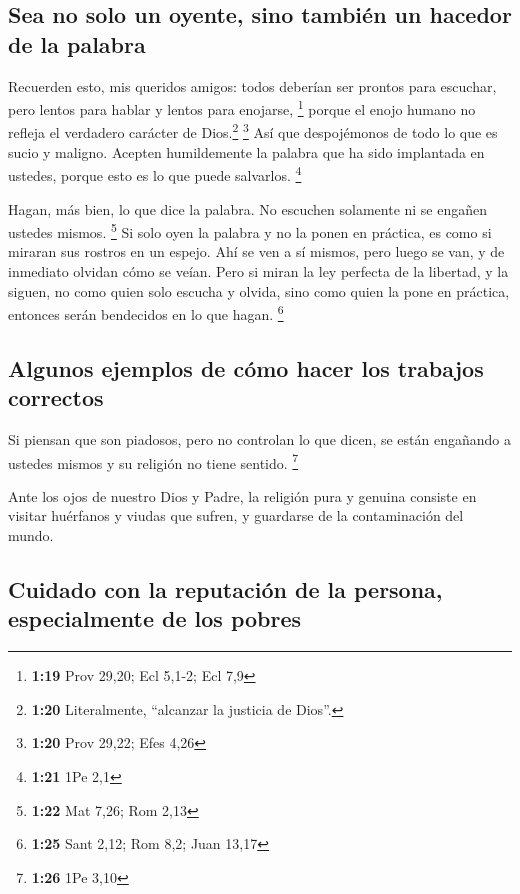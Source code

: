 \hypertarget{sea-no-solo-un-oyente-sino-tambiuxe9n-un-hacedor-de-la-palabra}{%
\subsection{Sea no solo un oyente, sino también un hacedor de la
palabra}\label{sea-no-solo-un-oyente-sino-tambiuxe9n-un-hacedor-de-la-palabra}}

 Recuerden esto, mis queridos amigos: todos deberían ser
prontos para escuchar, pero lentos para hablar y lentos para enojarse,
\footnote{\textbf{1:19} Prov 29,20; Ecl 5,1-2; Ecl 7,9} 
porque el enojo humano no refleja el verdadero carácter de
Dios.\footnote{\textbf{1:20} Literalmente, ``alcanzar la justicia de
  Dios''.} \footnote{\textbf{1:20} Prov 29,22; Efes 4,26}
 Así que despojémonos de todo lo que es sucio y maligno.
Acepten humildemente la palabra que ha sido implantada en ustedes,
porque esto es lo que puede salvarlos. \footnote{\textbf{1:21} 1Pe 2,1}

 Hagan, más bien, lo que dice la palabra. No escuchen
solamente ni se engañen ustedes mismos. \footnote{\textbf{1:22} Mat
  7,26; Rom 2,13}  Si solo oyen la palabra y no la ponen
en práctica, es como si miraran sus rostros en un espejo.
 Ahí se ven a sí mismos, pero luego se van, y de
inmediato olvidan cómo se veían.  Pero si miran la ley
perfecta de la libertad, y la siguen, no como quien solo escucha y
olvida, sino como quien la pone en práctica, entonces serán bendecidos
en lo que hagan. \footnote{\textbf{1:25} Sant 2,12; Rom 8,2; Juan 13,17}

\hypertarget{algunos-ejemplos-de-cuxf3mo-hacer-los-trabajos-correctos}{%
\subsection{Algunos ejemplos de cómo hacer los trabajos
correctos}\label{algunos-ejemplos-de-cuxf3mo-hacer-los-trabajos-correctos}}

 Si piensan que son piadosos, pero no controlan lo que
dicen, se están engañando a ustedes mismos y su religión no tiene
sentido. \footnote{\textbf{1:26} 1Pe 3,10}

 Ante los ojos de nuestro Dios y Padre, la religión pura
y genuina consiste en visitar huérfanos y viudas que sufren, y guardarse
de la contaminación del mundo.

\hypertarget{cuidado-con-la-reputaciuxf3n-de-la-persona-especialmente-de-los-pobres}{%
\subsection{Cuidado con la reputación de la persona, especialmente de
los
pobres}\label{cuidado-con-la-reputaciuxf3n-de-la-persona-especialmente-de-los-pobres}}

